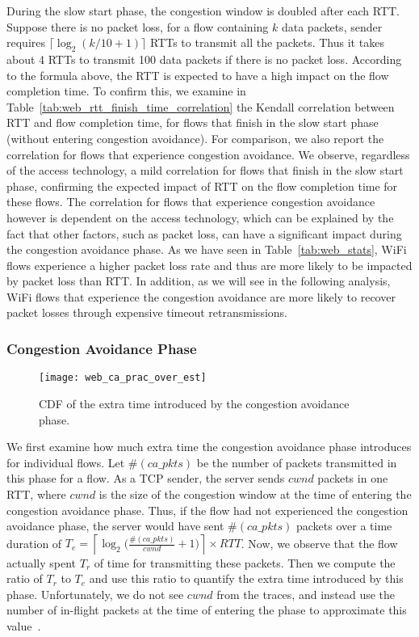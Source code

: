 During the slow start phase, the congestion window is doubled after each RTT. Suppose there is no packet loss, for a flow containing $k$ data packets, sender requires $\lceil{\log_2 (k/10+1)}\rceil$ RTTs to transmit all the packets. Thus it takes about 4 RTTs to transmit 100 data packets if there is no packet loss. According to the formula above, the RTT is expected to have a high impact on the flow completion time. To confirm this, we examine in Table~\ref{tab:web_rtt_finish_time_correlation} the Kendall correlation between RTT and flow completion time, for flows that finish in the slow start phase (\ie without entering congestion avoidance). For comparison, we also report the correlation for flows that experience congestion avoidance. We observe, regardless of the access technology, a mild correlation for flows that finish in the slow start phase, confirming the expected impact of RTT on the flow completion time for these flows. The correlation for flows that experience congestion avoidance however is dependent on the access technology, which can be explained by the fact that other factors, such as packet loss, can have a significant impact during the congestion avoidance phase. As we have seen in Table~\ref{tab:web_stats}, WiFi flows experience a higher packet loss rate and thus are more likely to be impacted by packet loss than RTT. In addition, as we will see in the following analysis, WiFi flows that experience the congestion avoidance are more likely to recover packet losses through expensive timeout retransmissions.

\subsubsection{Congestion Avoidance Phase}

\begin{figure}[th]
\centering
\texttt{[image: web\_ca\_prac\_over\_est]}
\caption{CDF of the extra time introduced by the congestion avoidance phase.}
\label{fig:web_ca_round}
\minsqueeze
\end{figure}

We first examine how much extra time the congestion avoidance phase introduces for individual flows. Let $\#(ca\_pkts)$ be the number of packets transmitted in this phase for a flow. As a TCP sender, the server sends $cwnd$ packets in one RTT, where $cwnd$ is the size of the congestion window at the time of entering the congestion avoidance phase. Thus, if the flow had not experienced the congestion avoidance phase, the server would have sent $\#(ca\_pkts)$ packets over a time duration of $T_e =  \left \lceil{ \log_2 (\frac{\#(ca\_pkts)}{cwnd}}+1) \right \rceil \times RTT$. Now, we observe that the flow actually spent $T_r$ of time for transmitting these packets. Then we compute the ratio of  $T_r$ to $T_e$ and use this ratio to quantify the extra time introduced by this phase. Unfortunately, we do not see $cwnd$ from the traces, and instead use the number of in-flight packets at the time of entering the phase to approximate this value~\cite{rfc56812009tcp}. 
 
